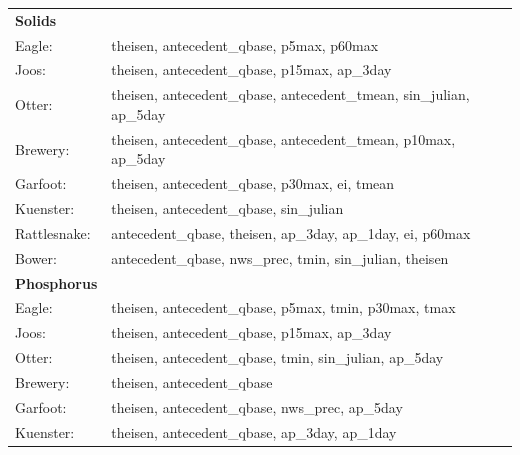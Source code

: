 \documentclass[10pt]{article}
\begin{document}
\begin{table}[h!]\small
    \begin{center}
    \begin{tabular}{ll}
        \textbf{Solids} & \\
        \hspace{5mm} Eagle: & theisen, antecedent\_qbase, p5max, p60max\\
        \hspace{5mm} Joos: & theisen, antecedent\_qbase, p15max, ap\_3day\\
        \hspace{5mm} Otter: & theisen, antecedent\_qbase, antecedent\_tmean, sin\_julian, ap\_5day\\
        \hspace{5mm} Brewery: & theisen, antecedent\_qbase, antecedent\_tmean, p10max, ap\_5day\\
        \hspace{5mm} Garfoot: & theisen, antecedent\_qbase, p30max, ei, tmean\\
        \hspace{5mm} Kuenster: & theisen, antecedent\_qbase, sin\_julian\\
        \hspace{5mm} Rattlesnake: & antecedent\_qbase, theisen, ap\_3day, ap\_1day, ei, p60max \\
        \hspace{5mm} Bower: & antecedent\_qbase, nws\_prec, tmin, sin\_julian, theisen
    \vspace{2mm}\\
        \textbf{Phosphorus} & \\
        \hspace{5mm} Eagle: & theisen, antecedent\_qbase, p5max, tmin, p30max, tmax\\
        \hspace{5mm} Joos: & theisen, antecedent\_qbase, p15max, ap\_3day\\
        \hspace{5mm} Otter: & theisen, antecedent\_qbase, tmin, sin\_julian, ap\_5day\\
        \hspace{5mm} Brewery: & theisen, antecedent\_qbase\\
        \hspace{5mm} Garfoot: & theisen, antecedent\_qbase, nws\_prec, ap\_5day\\
        \hspace{5mm} Kuenster: & theisen, antecedent\_qbase, ap\_3day, ap\_1day\\

\end{tabular}
\end{center}
\end{table}
\end{document}
